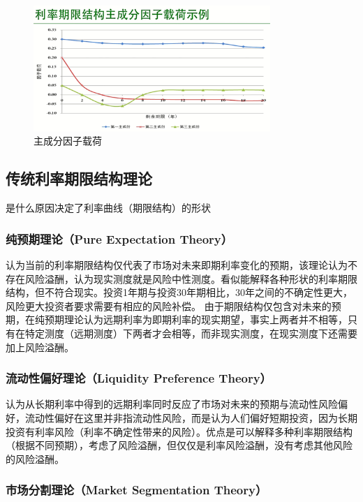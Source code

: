\documentclass[11pt]{article}
\begin{document}
\begin{figure}[H]
    \centering
    \includegraphics[width=0.8\textwidth]{fig/factor-loading.png}
	\caption{主成分因子载荷}
    \label{fig:factor-loading}
\end{figure}

\subsection{传统利率期限结构理论}

是什么原因决定了利率曲线（期限结构）的形状

\subsubsection{纯预期理论（Pure Expectation Theory）}

认为当前的利率期限结构仅代表了市场对未来即期利率变化的预期，该理论认为不存在风险溢酬，认为现实测度就是风险中性测度。看似能解释各种形状的利率期限结构，但不符合现实。投资1年期与投资30年期相比，30年之间的不确定性更大，风险更大投资者要求需要有相应的风险补偿。
由于期限结构仅包含对未来的预期，在纯预期理论认为远期利率为即期利率的现实期望，事实上两者并不相等，只有在特定测度（远期测度）下两者才会相等，而非现实测度，在现实测度下还需要加上风险溢酬。

\subsubsection{流动性偏好理论（Liquidity Preference Theory）}

认为从长期利率中得到的远期利率同时反应了市场对未来的预期与流动性风险偏好，流动性偏好在这里并非指流动性风险，而是认为人们偏好短期投资，因为长期投资有利率风险（利率不确定性带来的风险）。优点是可以解释多种利率期限结构（根据不同预期），考虑了风险溢酬，但仅仅是利率风险溢酬，没有考虑其他风险的风险溢酬。

\subsubsection{市场分割理论（Market Segmentation Theory）}
\end{document}
